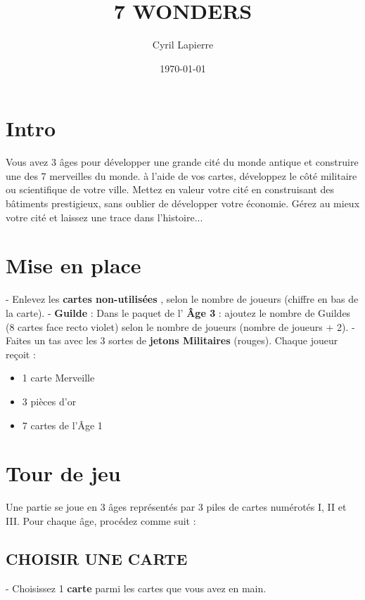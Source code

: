 \documentclass{article}%
\title{7 WONDERS}%
\author{Cyril Lapierre}%
\date{\today}%
\begin{document}
%
\pagestyle{empty}%
\normalsize%
\maketitle%
\section{ Intro
}%
\label{sec:Intro}%
Vous avez 3 âges pour développer une grande cité du monde antique et construire une des 7 merveilles du
%
monde. à l’aide de vos cartes, développez le côté militaire ou scientifique de votre ville. Mettez en valeur
%
votre cité en construisant des bâtiments prestigieux, sans oublier de développer votre économie.
%
Gérez au mieux votre cité et laissez une trace dans l'histoire...


%
\section{ Mise en place
}%
\label{sec:Miseenplace}%
{-} Enlevez les %
\textbf{cartes non{-}utilisées}%
, selon le nombre de joueurs (chiffre en bas de la carte).
%
{-} %
\textbf{Guilde}%
\textit{ }%
 : Dans le paquet de l'%
\textbf{Âge 3}%
\textit{ }%
 : ajoutez le nombre de Guildes (8 cartes face recto violet)
%
selon le nombre de joueurs (nombre de joueurs + 2).
%
{-} Faites un tas avec les 3 sortes de %
\textbf{jetons Militaires}%
\textit{ }%
 (rouges).
%
Chaque joueur reçoit :
%
\begin{itemize}%
\item%
%
 1 carte Merveille
%
\item%
%
 3 pièces d’or
%
\item%
%
 7 cartes de l'Âge 1
%
\end{itemize}

%
\section{ Tour de jeu
}%
\label{sec:Tourdejeu}%
Une partie se joue en 3 âges représentés par 3 piles de cartes numérotés I, II et III. Pour chaque âge, procédez comme suit :


%
\subsection{ CHOISIR UNE CARTE
}%
\label{subsec:CHOISIRUNECARTE}%
{-} Choisissez 1 %
\textbf{carte}%
\textit{ }%
 parmi les cartes que vous avez en main.


%
\end{document}
